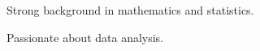 

\begin{cventries}

  \cventry
    {} %
    {} %
    {} %
    {} %
    {
      \begin{cvitems} %
      \item Strong background in mathematics and statistics.
      \item Passionate about data analysis. 
      \end{cvitems}
    }


\end{cventries}

